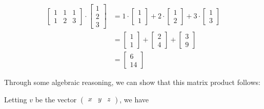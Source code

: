 \documentclass[12pt]{article}
\begin{document}
  \begin{align}
    \begin{bmatrix}
      1 & 1 & 1 \\
      1 & 2 & 3
    \end{bmatrix}
    \cdot
    \begin{bmatrix}
      1 \\
      2 \\
      3
    \end{bmatrix}
    &=
    1 \cdot \begin{bmatrix}
      1 \\
      1
    \end{bmatrix}
    +
    2 \cdot \begin{bmatrix}
      1 \\
      2
    \end{bmatrix}
    +
    3 \cdot \begin{bmatrix}
      1 \\
      3
    \end{bmatrix} \\
    &= \begin{bmatrix} 
      1 \\ 1
    \end{bmatrix} 
    + \begin{bmatrix}
      2 \\ 4
    \end{bmatrix}
    + \begin{bmatrix}
      3 \\ 9
    \end{bmatrix} \\
    &= \begin{bmatrix}
      6 \\ 14
    \end{bmatrix}
  \end{align}

Through some algebraic reasoning, we can show that this matrix product follows:

Letting $v$ be the vector $\begin{pmatrix} x & y & z \end{pmatrix}$, we have
\end{document}
